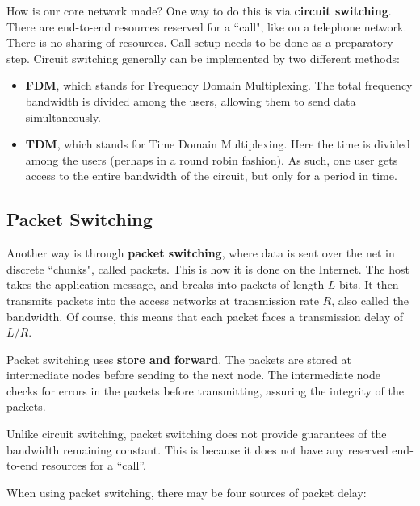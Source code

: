 \documentclass[12pt,letterpaper]{book}
\theoremstyle{definition}
\begin{document}
How is our core network made? One way to do this is via \textbf{circuit switching}. There are end-to-end resources reserved for a ``call", like on a telephone network. There is no sharing of resources. Call setup needs to be done as a preparatory step. Circuit switching generally can be implemented by two different methods:

\begin{itemize}
  \item \textbf{FDM}, which stands for Frequency Domain Multiplexing. The total frequency bandwidth is divided among the users, allowing them to send data simultaneously.
  \item \textbf{TDM}, which stands for Time Domain Multiplexing. Here the time is divided among the users (perhaps in a round robin fashion). As such, one user gets access to the entire bandwidth of the circuit, but only for a period in time.
\end{itemize}

\subsection{Packet Switching}

Another way is through \textbf{packet switching}, where data is sent over the net in discrete ``chunks", called packets. This is how it is done on the Internet. The host takes the application message, and breaks into packets of length $L$ bits. It then transmits packets into the access networks at transmission rate $R$, also called the bandwidth. Of course, this means that each packet faces a transmission delay of $L/R$.

Packet switching uses \textbf{store and forward}. The packets are stored at intermediate nodes before sending to the next node. The intermediate node checks for errors in the packets before transmitting, assuring the integrity of the packets.

Unlike circuit switching, packet switching does not provide guarantees of the bandwidth remaining constant. This is because it does not have any reserved end-to-end resources for a ``call''.

When using packet switching, there may be four sources of packet delay:
\end{document}
